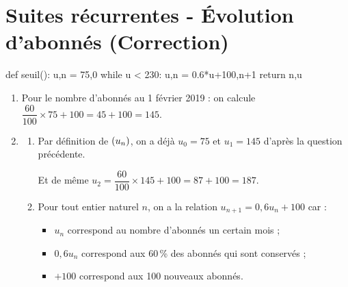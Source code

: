 \documentclass[a4paper,11pt]{article}
\author{Pierquet}
\title{\nomfichier}
\begin{document}
\pagestyle{fancy}

\part{Suites récurrentes - Évolution d'abonnés (Correction)}

\begin{pyconcode}
def seuil():
	u,n = 75,0
	while u < 230:
		u,n = 0.6*u+100,n+1
	return n,u
	

\end{pyconcode}

\medskip

\begin{cmanip}
\vspace{-0.45cm}
\begin{enumerate}
	\item Pour le nombre d'abonnés au 1 février 2019  : on calcule $\dfrac{60}{100} \times 75 + 100 = 45 + 100=145$.
	\item 
	\begin{enumerate}
		\item Par définition de $\left( u_n \right)$, on a déjà $u_0=75$ et $u_1=145$ d'après la question précédente.
		
		Et de même $u_2 = \dfrac{60}{100} \times 145 + 100 = 87 + 100=187$.
		\item Pour tout entier naturel $n$, on a la relation $u_{n+1}=0,6u_n+100$ car :
		\begin{itemize}
			\item $u_n$ correspond au nombre d'abonnés un certain mois ;
			\item $0,6u_n$ correspond aux 60\,\% des abonnés qui sont \og conservés \fg{} ;
			\item $+100$ correspond aux 100 nouveaux abonnés. 
		\end{itemize}
	\end{enumerate}
\end{enumerate}
\end{cmanip}
\end{document}
